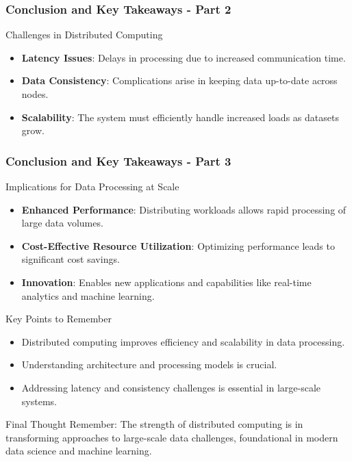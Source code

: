 \documentclass[aspectratio=169]{beamer}
\begin{document}
\begin{frame}[fragile]
  \frametitle{Conclusion and Key Takeaways - Part 2}
  \begin{block}{Challenges in Distributed Computing}
    \begin{itemize}
      \item \textbf{Latency Issues}: Delays in processing due to increased communication time.
      \item \textbf{Data Consistency}: Complications arise in keeping data up-to-date across nodes.
      \item \textbf{Scalability}: The system must efficiently handle increased loads as datasets grow.
    \end{itemize}
  \end{block}
\end{frame}

\begin{frame}[fragile]
  \frametitle{Conclusion and Key Takeaways - Part 3}
  \begin{block}{Implications for Data Processing at Scale}
    \begin{itemize}
      \item \textbf{Enhanced Performance}: Distributing workloads allows rapid processing of large data volumes.
      \item \textbf{Cost-Effective Resource Utilization}: Optimizing performance leads to significant cost savings.
      \item \textbf{Innovation}: Enables new applications and capabilities like real-time analytics and machine learning.
    \end{itemize}
  \end{block}

  \begin{block}{Key Points to Remember}
    \begin{itemize}
      \item Distributed computing improves efficiency and scalability in data processing.
      \item Understanding architecture and processing models is crucial.
      \item Addressing latency and consistency challenges is essential in large-scale systems.
    \end{itemize}
  \end{block}

  \begin{block}{Final Thought}
    Remember: The strength of distributed computing is in transforming approaches to large-scale data challenges, foundational in modern data science and machine learning.
  \end{block}
\end{frame}
\end{document}
